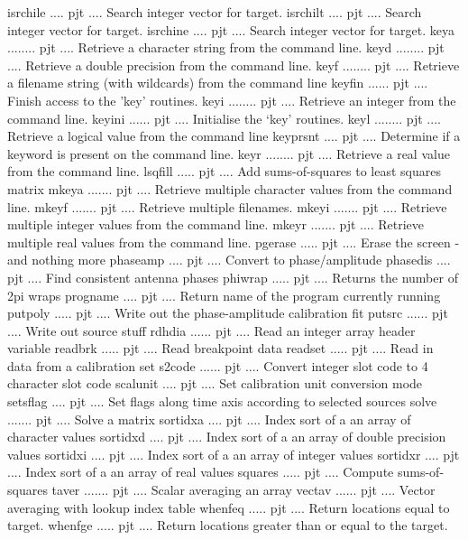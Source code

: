 {\eightpoint\begintt
isrchile .... pjt .... Search integer vector for target. 
isrchilt .... pjt .... Search integer vector for target. 
isrchine .... pjt .... Search integer vector for target. 
keya ........ pjt .... Retrieve a character string from the command line. 
keyd ........ pjt .... Retrieve a double precision from the command line. 
\endtt}
{\eightpoint\begintt
keyf ........ pjt .... Retrieve a filename string (with wildcards) from the command line 
keyfin ...... pjt .... Finish access to the 'key' routines. 
keyi ........ pjt .... Retrieve an integer from the command line. 
keyini ...... pjt .... Initialise the `key' routines. 
keyl ........ pjt .... Retrieve a logical value from the command line 
\endtt}
{\eightpoint\begintt
keyprsnt .... pjt .... Determine if a keyword is present on the command line. 
keyr ........ pjt .... Retrieve a real value from the command line. 
lsqfill ..... pjt .... Add sums-of-squares to least squares matrix 
mkeya ....... pjt .... Retrieve multiple character values from the command line.
mkeyf ....... pjt .... Retrieve multiple filenames. 
\endtt}
{\eightpoint\begintt
mkeyi ....... pjt .... Retrieve multiple integer values from the command line. 
mkeyr ....... pjt .... Retrieve multiple real values from the command line. 
pgerase ..... pjt .... Erase the screen - and nothing more 
phaseamp .... pjt .... Convert to phase/amplitude 
phasedis .... pjt .... Find consistent antenna phases 
\endtt}
{\eightpoint\begintt
phiwrap ..... pjt .... Returns the number of 2pi wraps 
progname .... pjt .... Return name of the program currently running 
putpoly ..... pjt .... Write out the phase-amplitude calibration fit 
putsrc ...... pjt .... Write out source stuff 
rdhdia ...... pjt .... Read an integer array header variable 
\endtt}
{\eightpoint\begintt
readbrk ..... pjt .... Read breakpoint data 
readset ..... pjt .... Read in data from a calibration set 
s2code ...... pjt .... Convert integer slot code to 4 character slot code 
scalunit .... pjt .... Set calibration unit conversion mode 
setsflag .... pjt .... Set flags along time axis according to selected sources 
\endtt}
{\eightpoint\begintt
solve ....... pjt .... Solve a matrix 
sortidxa .... pjt .... Index sort of a an array of character values 
sortidxd .... pjt .... Index sort of a an array of double precision values 
sortidxi .... pjt .... Index sort of a an array of integer values 
sortidxr .... pjt .... Index sort of a an array of real values 
\endtt}
{\eightpoint\begintt
squares ..... pjt .... Compute sums-of-squares 
taver ....... pjt .... Scalar averaging an array 
vectav ...... pjt .... Vector averaging with lookup index table 
whenfeq ..... pjt .... Return locations equal to target. 
whenfge ..... pjt .... Return locations greater than or equal to the target. 
\endtt}

